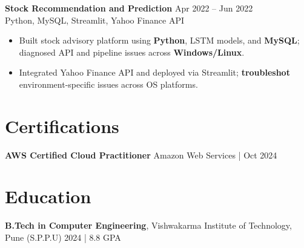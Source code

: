\documentclass[10pt,letterpaper]{article}
\newcommand{\resumeSubheading}[4]{%
  \textbf{#1} \hfill #2 \\
  #3 \hfill #4 \\
}
\begin{document}
\resumeSubheading{Stock Recommendation and Prediction}{Apr 2022 -- Jun 2022}{}{Python, MySQL, Streamlit, Yahoo Finance API}
\begin{itemize}
    \item Built stock advisory platform using \textbf{Python}, LSTM models, and \textbf{MySQL}; diagnosed API and pipeline issues across \textbf{Windows/Linux}.
    \item Integrated Yahoo Finance API and deployed via Streamlit; \textbf{troubleshot} environment-specific issues across OS platforms.
\end{itemize}

\section*{Certifications}
\textbf{AWS Certified Cloud Practitioner} \hfill Amazon Web Services \enspace | \enspace Oct 2024

\section*{Education}
\textbf{B.Tech in Computer Engineering}, Vishwakarma Institute of Technology, Pune (S.P.P.U) \hfill 2024 | 8.8 GPA
\end{document}
